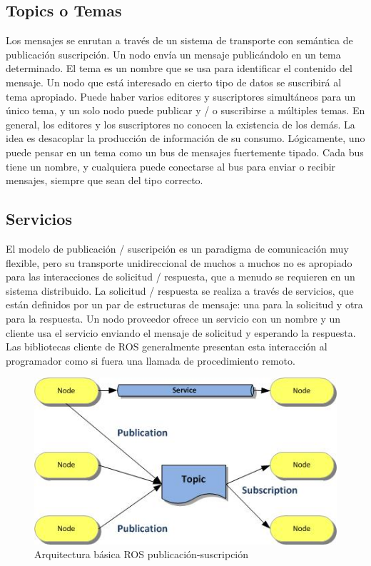 \subsection{Topics o Temas}
Los mensajes se enrutan a través de un sistema de transporte con semántica de publicación suscripción. Un nodo envía un mensaje publicándolo en un tema determinado. El tema es un nombre que se usa para identificar el contenido del mensaje. Un nodo que está interesado en cierto tipo de datos se suscribirá al tema apropiado. Puede haber varios editores y suscriptores simultáneos para un único tema, y un solo nodo puede publicar y / o suscribirse a múltiples temas. En general, los editores y los suscriptores no conocen la existencia de los demás. La idea es desacoplar la producción de información de su consumo. Lógicamente, uno puede pensar en un tema como un bus de mensajes fuertemente tipado. Cada bus tiene un nombre, y cualquiera puede conectarse al bus para enviar o recibir mensajes, siempre que sean del tipo correcto.

\subsection{Servicios}
El modelo de publicación / suscripción es un paradigma de comunicación muy flexible, pero su transporte unidireccional de muchos a muchos no es apropiado para las interacciones de solicitud / respuesta, que a menudo se requieren en un sistema distribuido. La solicitud / respuesta se realiza a través de servicios, que están definidos por un par de estructuras de mensaje: una para la solicitud y otra para la respuesta. Un nodo proveedor ofrece un servicio con un nombre y un cliente usa el servicio enviando el mensaje de solicitud y esperando la respuesta. Las bibliotecas cliente de ROS generalmente presentan esta interacción al programador como si fuera una llamada de procedimiento remoto.

\begin{figure}[H]
    \centering
    \includegraphics[scale=1]{img/ros-architecture-3.jpg}
  	\caption{Arquitectura básica ROS publicación-suscripción}
  	\label{fig:ros-servicio}
\end{figure}
